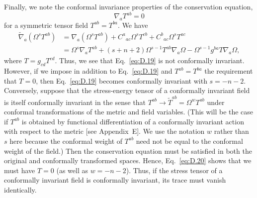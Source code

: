Finally, we note the conformal invariance properties of the conservation equation,
\begin{equation}
  \nabla_aT^{ab}=0
  \tag{D.19}\label{eq:D.19}
\end{equation}
for a symmetric tensor field \(T^{ab}=T^{ba}\). We have
\begin{equation}
\begin{aligned}
  \widetilde\nabla_a(\Omega^sT^{ab})
  &=\nabla_a(\Omega^sT^{ab})
  +C^a{}_{ac}\Omega^sT^{cb}+C^b{}_{ac}\Omega^sT^{ac}\\
  &=\Omega^s\nabla_aT^{ab}
  +(s+n+2)\Omega^{s-1}T^{ab}\nabla_a\Omega
  -\Omega^{s-1}g^{ba}T\nabla_a\Omega,
\end{aligned}
  \tag{D.20}\label{eq:D.20}
\end{equation}
where \(T=g_{cd}T^{cd}\). Thus, we see that Eq.~\eqref{eq:D.19} is not conformally
invariant. However, if we impose in addition to Eq.~\eqref{eq:D.19} and
\(T^{ab}=T^{ba}\) the requirement that \(T=0\), then Eq.~\eqref{eq:D.19} becomes
conformally invariant with \(s=-n-2\). Conversely, suppose that the stress-energy
tensor of a conformally invariant field is itself conformally invariant in the sense
that \(T^{ab}\longrightarrow\widetilde T^{ab}=\Omega^wT^{ab}\) under conformal
transformations of the metric and field variables. (This will be the case if \(T^{ab}\)
is obtained by functional differentiation of a conformally invariant action with
respect to the metric [see Appendix~E]. We use the notation \(w\) rather than \(s\)
here because the conformal weight of \(T^{ab}\) need not be equal to the conformal
weight of the field.) Then the conservation equation must be satisfied in both the
original and conformally transformed spaces. Hence, Eq.~\eqref{eq:D.20} shows that
we must have \(T=0\) (as well as \(w=-n-2\)). Thus, if the stress tensor of a
conformally invariant field is conformally invariant, its trace must vanish
identically.
